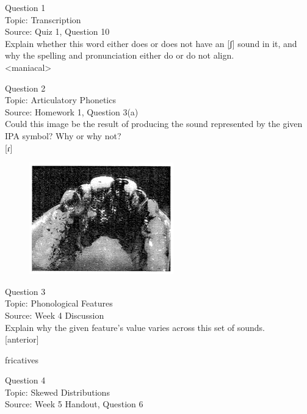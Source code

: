 \documentclass[12pt]{article}
\begin{document}
{\large Question 1}\\

Topic: Transcription\\
Source: Quiz 1, Question 10\\

Explain whether this word either does or does not have an [ʃ] sound in it, and why the spelling and pronunciation either do or do not align.\\

<maniacal>


\newpage

{\large Question 2}\\

Topic: Articulatory Phonetics\\
Source: Homework 1, Question 3(a)\\

Could this image be the result of producing the sound represented by the given IPA symbol? Why or why not?\\

{[ɾ]}

\begin{figure}[H]
\includegraphics{../images/staticpalatography_stop.png}
\end{figure}

\newpage

{\large Question 3}\\

Topic: Phonological Features\\
Source: Week 4 Discussion\\

Explain why the given feature's value varies across this set of sounds.\\

{[anterior]}

fricatives


\newpage

{\large Question 4}\\

Topic: Skewed Distributions\\
Source: Week 5 Handout, Question 6\\
\end{document}
